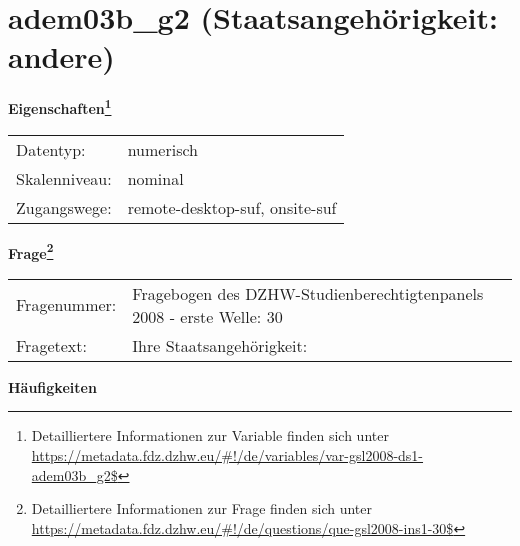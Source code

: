 
    \setcounter{footnote}{0}

    \vspace*{-1.8cm}
	\section{adem03b\_g2 (Staatsangehörigkeit: andere)}
	\label{section:adem03b_g2}



    \vspace*{0.5cm}
    \noindent\textbf{Eigenschaften\footnote{Detailliertere Informationen zur Variable finden sich unter
		\url{https://metadata.fdz.dzhw.eu/\#!/de/variables/var-gsl2008-ds1-adem03b_g2$}}}\\
	\begin{tabularx}{\hsize}{@{}lX}
	Datentyp: & numerisch \\
	Skalenniveau: & nominal \\
	Zugangswege: &
	  remote-desktop-suf, 
	  onsite-suf
 \\
    \end{tabularx}



				\vspace*{0.5cm}
                \noindent\textbf{Frage\footnote{Detailliertere Informationen zur Frage finden sich unter
		              \url{https://metadata.fdz.dzhw.eu/\#!/de/questions/que-gsl2008-ins1-30$}}}\\
				\begin{tabularx}{\hsize}{@{}lX}
					Fragenummer: &
					  Fragebogen des DZHW-Studienberechtigtenpanels 2008 - erste Welle:
					  30
 \\
					Fragetext: & Ihre Staatsangehörigkeit: \\
				\end{tabularx}





        		\vspace*{0.5cm}
                \noindent\textbf{Häufigkeiten}

